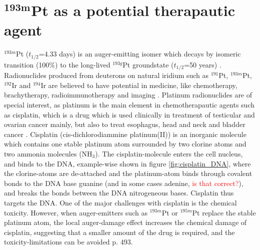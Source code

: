 






\section{$\mathbf{^{193m}}$Pt as a potential therapautic agent}
$^{193m}$Pt ($t_{1/2}$=4.33 days) is an auger-emitting isomer which decays by isomeric transition (100\%) to the long-lived $^{193g}$Pt groundstate ($t_{1/2}$=50 years) \cite{ShamsuzzohaBasunia2017a}. Radionuclides produced from deuterons on natural iridium such as $^{191}$Pt, $^{193m}$Pt, $^{192}$Ir and $^{194}$Ir are believed to have potential in medicine, like chemotherapy, brachytherapy, radioimmunotherapy and imaging \cite{Tarkanyi2006a}. Platinum radionuclides are of special interest, as platinum is the main element in chemotherapautic agents such as cisplatin, which is a drug which is used clinically in treatment of testicular and ovarian cancer mainly, but also to treat esophagus, head and neck and bladder cancer \cite{Areberg1999}. Cisplatin  (cis-dichlorodiammine platinum(II)) is an inorganic molecule which contains one stable platinum atom surrounded by two clorine atoms and two ammonia molecules (NH$_3$). The cisplatin-molecule enters the cell nucleus, and binds to the DNA, example-wise shown in figure \ref{fig:cisplatin_DNA}, where the clorine-atoms are de-attached and the platinum-atom binds through covalent bonds to the DNA base guanine (and in some cases adenine, \textcolor{red}{is that correct?}), and breaks the bonds between the DNA nitrogeneous bases. Cisplatin thus targets the DNA. One of the major challenges with cisplatin is the chemical toxicity. However, when auger-emitters such as $^{193m}$Pt or $^{195m}$Pt replace the stable platinum atom, the local auger-damage effect increases the chemical damage of cisplatin, suggesting that a smaller amount of the drug is required, and the toxicity-limitations can be avoided \cite{HowellRogerW.SastryKandulaS.R.HillHeleneZ.Rao1985} p. 493. %

